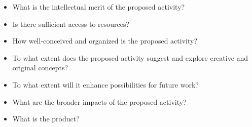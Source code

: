 \begin{itemize}
\itemsep1pt\parskip0pt
\item
  What is the intellectual merit of the proposed activity?
\item
  Is there sufficient access to resources?
\item
  How well-conceived and organized is the proposed activity?
\item
  To what extent does the proposed activity suggest and explore creative
  and original concepts?
\item
  To what extent will it enhance possibilities for future work?
\item
  What are the broader impacts of the proposed activity?
\item
  What is the product?
\end{itemize}

